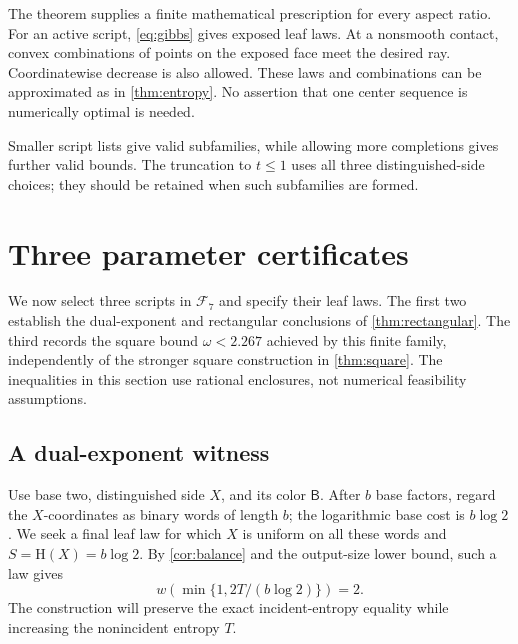 \documentclass[11pt]{article}
\numberwithin{equation}{section}
\theoremstyle{definition}
\theoremstyle{remark}
\begin{document}
The theorem supplies a finite mathematical prescription for every
aspect ratio.
For an active script, \eqref{eq:gibbs} gives exposed leaf laws.
At a nonsmooth contact, convex combinations of points on the exposed
face meet the desired ray.  Coordinatewise decrease is also allowed.
These laws and combinations can be approximated as in
\cref{thm:entropy}.
No assertion that one center sequence is numerically optimal is needed.

Smaller script lists give valid subfamilies, while allowing more
completions gives further valid bounds.
The truncation to \(t\le1\) uses all three distinguished-side choices;
they should be retained when such subfamilies are formed.

\section{Three parameter certificates}\label{sec:certificates}

We now select three scripts in \(\mathcal F_7\) and specify their leaf laws.
The first two establish the dual-exponent and rectangular conclusions
of \cref{thm:rectangular}.  The third records the square bound
\(\omega<2.267\) achieved by this finite family, independently of the
stronger square construction in \cref{thm:square}.
The inequalities in this section use rational enclosures, not numerical
feasibility assumptions.

\subsection{A dual-exponent witness}\label{subsec:dual}

Use base two, distinguished side \(X\), and its color \(\mathsf B\).
After \(b\) base factors, regard the \(X\)-coordinates as binary words
of length \(b\); the logarithmic base cost is \(b\log2\).
We seek a final leaf law for which \(X\) is uniform on all these words
and \(S=\mathrm H(X)=b\log2\).
By \cref{cor:balance} and the output-size lower bound, such a law gives
\[
 w\!\left(\min\{1,2T/(b\log2)\}\right)=2.
\]
The construction will preserve the exact incident-entropy equality
while increasing the nonincident entropy \(T\).
\end{document}
